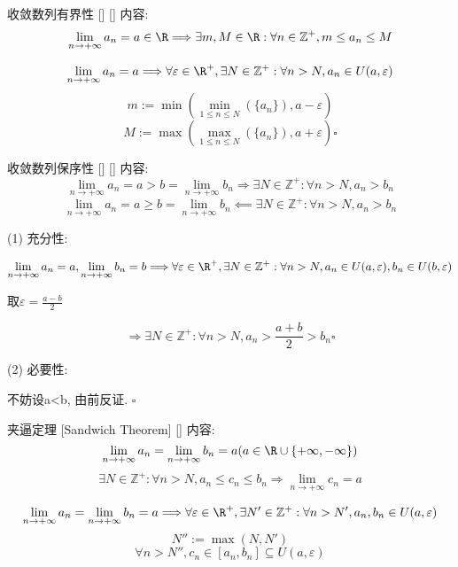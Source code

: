 \documentclass[UTF8]{ctexart}
\begin{document}
			\begin{ppt}
			    []
			    {收敛数列有界性}
			    []
			    []
				内容: 
				\[\lim_{n\to+\infty}a_n=a\in\R\Longrightarrow\exists m,M\in\R: \forall n\in\mathbb{Z}^+, m\leq a_n\leq M\]
			\end{ppt}
			
			\begin{prf}
				\[\lim_{n\to+\infty}a_n=a\Longrightarrow\forall\varepsilon\in\R^+, \exists N\in\mathbb{Z}^+: \forall n>N, a_n\in U(a,\varepsilon)\]
				\[m:=\min(\min_{1\leq n\leq N}(\{a_n\}),a-\varepsilon)\]
				\[M:=\max(\max_{1\leq n\leq N}(\{a_n\}),a+\varepsilon)\square\]
                \end{prf}
   
			\begin{ppt}
			    []
			    {收敛数列保序性}
			    []
			    []
				内容: 
				\[\lim_{n\to+\infty}a_n=a>b=\lim_{n\to+\infty}b_n\Longrightarrow\exists N\in\mathbb{Z}^+: \forall n>N, a_n>b_n\]
				\[\lim_{n\to+\infty}a_n=a\geq b=\lim_{n\to+\infty}b_n\impliedby\exists N\in\mathbb{Z}^+: \forall n>N, a_n>b_n\]
			\end{ppt}
			
			\begin{prf}
                (1) 充分性: 
   
				\[\lim_{n\to+\infty}a_n=a,\lim_{n\to+\infty}b_n=b\Longrightarrow\forall\varepsilon\in\R^+, \exists N\in\mathbb{Z}^+: \forall n>N, a_n\in U(a,\varepsilon), b_n\in U(b,\varepsilon)\]
				
				取\(\varepsilon=\frac{a-b}{2}\)
				
				\[\Longrightarrow\exists N\in\mathbb{Z}^+: \forall n>N, a_n>\frac{a+b}{2}>b_n\square\]

				(2) 必要性: 

				不妨设a<b, 由前反证. \(\square\)
            \end{prf}
			
			\begin{ppt}
			    []
			    {夹逼定理 }
			    [Sandwich Theorem]
			    []
                内容: 
                \[\lim_{n\to+\infty}a_n=\lim_{n\to+\infty}b_n=a(a\in\R\cup\{+\infty,-\infty\})\]
				\[\exists N\in\mathbb{Z}^+: \forall n>N, a_n\leq c_n\leq b_n\Longrightarrow\lim_{n\to+\infty}c_n=a\]
			\end{ppt}
			
			\begin{prf}
				\[\lim_{n\to+\infty}a_n=\lim_{n\to+\infty}b_n=a\Longrightarrow\forall\varepsilon\in\R^+, \exists N'\in\mathbb{Z}^+: \forall n>N', a_n,b_n\in U(a,\varepsilon)\]
				\[N'':=\max(N,N')\]
				\[\forall n>N'', c_n\in[a_n,b_n]\subseteq U(a,\varepsilon)\]
            \end{prf}
			
\end{document}
